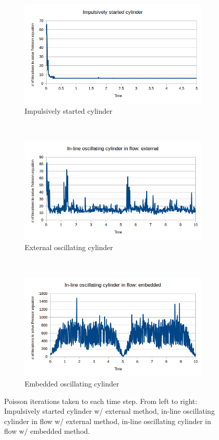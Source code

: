 \begin{figure}[htb]
	\centering
	\begin{subfigure}{0.3\textwidth}
		\includegraphics[width=\linewidth]{cy_iter}
		\caption{Impulsively started cylinder}
	\end{subfigure}
	~
	\begin{subfigure}{0.3\textwidth}
		\includegraphics[width=\linewidth]{ex_iter}
		\caption{External oscillating cylinder}
	\end{subfigure}
	~
	\begin{subfigure}{0.3\textwidth}
		\includegraphics[width=\linewidth]{em_iter}
		\caption{Embedded oscillating cylinder}
	\end{subfigure}
	\caption{Poisson iterations taken to each time step. From left to right: Impulsively started cylinder w/ external method, in-line oscillating cylinder in flow w/ external method, in-line oscillating cylinder in flow w/ embedded method.}
	\label{fig:iter}
\end{figure}

